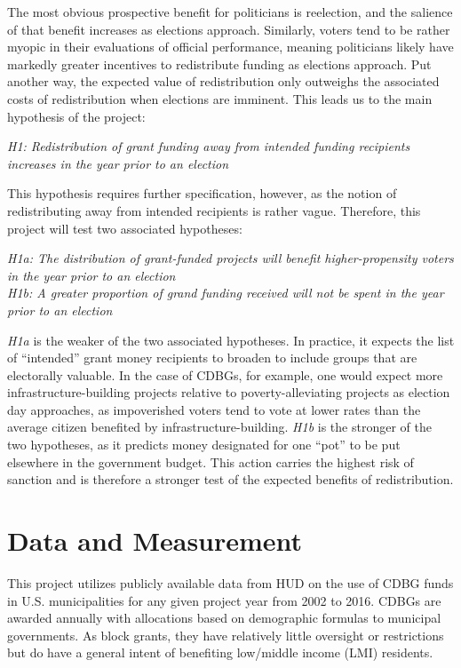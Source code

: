 \documentclass[12pt,a4paper]{article}
\begin{document}
\par The most obvious prospective benefit for politicians is reelection, and the salience of that benefit increases as elections approach. Similarly, voters tend to be rather myopic in their evaluations of official performance, meaning politicians likely have markedly greater incentives to redistribute funding as elections approach. Put another way, the expected value of redistribution only outweighs the associated costs of redistribution when elections are imminent. This leads us to the main hypothesis of the project:

\begin{center}
	\textit{H1: Redistribution of grant funding away from intended funding recipients increases in the year prior to an election}	
\end{center}

\par This hypothesis requires further specification, however, as the notion of redistributing away from intended recipients is rather vague. Therefore, this project will test two associated hypotheses:

\begin{center}
	\textit{H1a: The distribution of grant-funded projects will benefit higher-propensity voters in the year prior to an election}\\
	\textit{H1b: A greater proportion of grand funding received will not be spent in the year prior to an election}\\	
\end{center}

\par \textit{H1a} is the weaker of the two associated hypotheses. In practice, it expects the list of ``intended'' grant money recipients to broaden to include groups that are electorally valuable. In the case of CDBGs, for example, one would expect more infrastructure-building projects relative to poverty-alleviating projects as election day approaches, as impoverished voters tend to vote at lower rates than the average citizen benefited by infrastructure-building. \textit{H1b} is the stronger of the two hypotheses, as it predicts money designated for one ``pot'' to be put elsewhere in the government budget. This action carries the highest risk of sanction and is therefore a stronger test of the expected benefits of redistribution.

\section{Data and Measurement}
\par This project utilizes publicly available data from HUD on the use of CDBG funds in U.S. municipalities for any given project year from 2002 to 2016. CDBGs are awarded annually with allocations based on demographic formulas to municipal governments. As block grants, they have relatively little oversight or restrictions but do have a general intent of benefiting low/middle income (LMI) residents.
\end{document}
